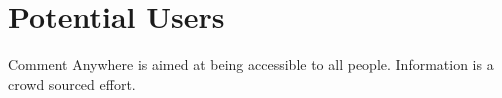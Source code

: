 \documentclass[proposal.tex]{subfiles}
\begin{document}
    
\section{Potential Users}

Comment Anywhere is aimed at being accessible to all people.
Information is a crowd sourced effort.
\end{document}
